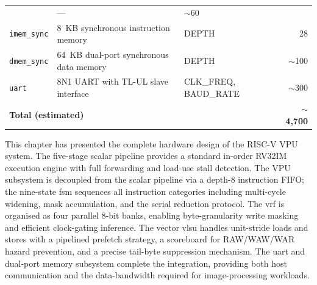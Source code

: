 \begin{table}[H]
\begin{tabular}{p{4.5cm}p{4.5cm}p{3.5cm}r}
                                   & ---                    & $\sim$60  \\
\texttt{imem\_sync}               & 8~KB synchronous instruction memory
                                   & DEPTH                  & 28   \\
\texttt{dmem\_sync}               & 64~KB dual-port synchronous data memory
                                   & DEPTH                  & $\sim$100 \\
\texttt{uart}                     & 8N1 UART with TL-UL slave interface
                                   & CLK\_FREQ, BAUD\_RATE  & $\sim$300 \\
\bottomrule
\multicolumn{3}{l}{\textbf{Total (estimated)}} & $\mathbf{\sim}$\textbf{4{,}700} \\
\bottomrule
\end{tabular}
\end{table}

This chapter has presented the complete hardware design of the RISC-V VPU system.
The five-stage scalar pipeline provides a standard in-order RV32IM execution engine
with full forwarding and load-use stall detection. The VPU subsystem is decoupled from
the scalar pipeline via a depth-8 instruction FIFO; the nine-state \gls{fsm} sequences
all instruction categories including multi-cycle widening, mask accumulation, and the
serial reduction protocol. The \gls{vrf} is organised as four parallel 8-bit banks,
enabling byte-granularity write masking and efficient clock-gating inference. The
vector \gls{vlsu} handles unit-stride loads and stores with a pipelined prefetch
strategy, a scoreboard for RAW/WAW/WAR hazard prevention, and a precise tail-byte
suppression mechanism. The \gls{uart} and dual-port memory subsystem complete the
integration, providing both host communication and the data-bandwidth required for
image-processing workloads.
